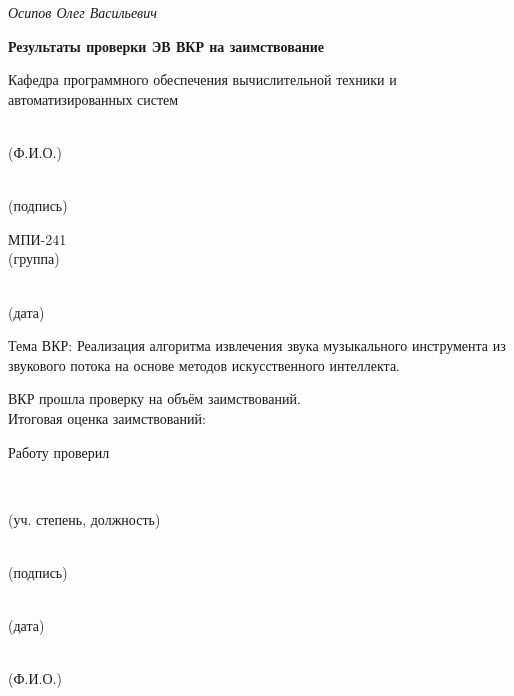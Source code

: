 \documentclass[14pt]{extarticle}
\begin{document}
\vspace{2em}

{\small
	\noindent{} \textit{Осипов Олег Васильевич}}\\[-0.5em]
\noindent
\hspace*{5cm}{\footnotesize (подпись)}
\hspace{5cm}{\footnotesize (Ф.И.О.)}


\newpage
\advance\hoffset 1.5cm %
\begin{center}
	\textbf{Результаты проверки ЭВ ВКР на заимствование}
\end{center}

\vspace{1em}

\noindent Кафедра программного обеспечения вычислительной техники и автоматизированных систем\\[0.5em]

\noindent
{}%
\parbox[t]{3.5cm}{\centering {}\\[-0.5em] {\footnotesize (Ф.И.О.)}}%
\parbox[t]{4.5cm}{\centering \,\\[-0.5em] {\footnotesize (подпись)}}%
\parbox[t]{2.2cm}{\centering МПИ-241\\[-0.5em] {\footnotesize (группа)}}%
\parbox[t]{2.5cm}{\centering \,\\[-0.5em] {\footnotesize (дата)}}%


\vspace{1em}

\noindent
Тема ВКР: Реализация алгоритма извлечения звука музыкального инструмента из звукового потока на основе методов искусственного интеллекта.

\vspace{1em}

\noindent
ВКР прошла проверку на объём заимствований.\\
Итоговая оценка заимствований:

\vspace{3em}
\noindent Работу проверил\\
\noindent
\makebox[0.0cm][l]{\underline{\hspace{\linewidth}}}%
\parbox[t]{5.4cm}{\\[-0.2em]%
{\centering\footnotesize (уч. степень, должность)\par}}%
\parbox[t]{4.0cm}{\centering \,\\[-0.2em] \footnotesize (подпись)\par}%
\parbox[t]{2.5cm}{\centering \,\\[-0.2em] \footnotesize (дата) \par}%
\parbox[t]{4.5cm}{\centering {}\\[-0.2em] \footnotesize (Ф.И.О.)\par}%
\end{document}
